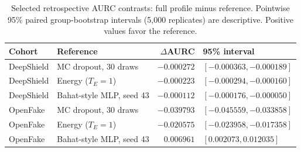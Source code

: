 \begin{table}[t]
\caption{Selected retrospective AURC contrasts: full profile minus reference. Pointwise 95\% paired group-bootstrap intervals (5,000 replicates) are descriptive. Positive values favor the reference.}
\label{tab:referenceci}
\centering\small
\begin{tabular}{llrl}
\toprule
Cohort & Reference & $\Delta$AURC & 95\% interval \\
\midrule
DeepShield & MC dropout, 30 draws & $-0.000272$ & $[-0.000363, -0.000189]$ \\
DeepShield & Energy ($T_E=1$) & $-0.000223$ & $[-0.000294, -0.000160]$ \\
DeepShield & Bahat-style MLP, seed 43 & $-0.000112$ & $[-0.000176, -0.000050]$ \\
OpenFake & MC dropout, 30 draws & $-0.039793$ & $[-0.045559, -0.033858]$ \\
OpenFake & Energy ($T_E=1$) & $-0.020575$ & $[-0.023958, -0.017358]$ \\
OpenFake & Bahat-style MLP, seed 43 & $0.006961$ & $[0.002073, 0.012035]$ \\
\bottomrule
\end{tabular}
\end{table}
